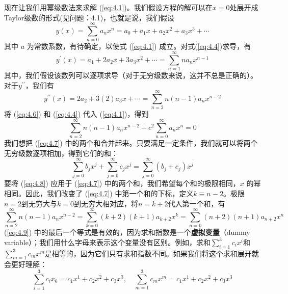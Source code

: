     现在让我们用幂级数法来求解 (\ref{eq:4.1})。我们假设方程的解可以在$x=0$处展开成Taylor级数的形式(见问题：4.1)，也就是说，我们假设
    \begin{equation}
        y\left(x\right) = \sum_{n=0}^{\infty}a_nx^n = a_0 + a_1 x + a_2 x^2 + a_3 x^3 + \cdots
        \label{eq:4.4}
    \end{equation}
    其中 $a$ 为常数系数，有待确定，以使式 (\ref{eq:4.1}) 成立。对式(\ref{eq:4.4})求导，有
    \begin{equation}
        y^{\prime}\left(x\right) = a_1 + 2a_2 x + 3a_3 x^2 + \cdots = \sum_{n=1}^{\infty}na_nx^{n-1}
        \label{eq:4.5}
    \end{equation}
    其中，我们假设该数列可以逐项求导（对于无穷级数来说，这并不总是正确的）。对于$y^{\prime\prime}$，我们有
    \begin{equation}
        y^{\prime\prime}\left(x\right) = 2a_2 + 3\left(2\right)a_3 x + \cdots = \sum_{n=2}^{\infty}n(n-1)a_nx^{n-2}
        \label{eq:4.6}
    \end{equation}
    将 (\ref{eq:4.6}) 和 (\ref{eq:4.4}) 代入 (\ref{eq:4.1})，得到
    \begin{equation}
        \sum_{n=2}^{\infty}n(n-1)a_nx^{n-2} + c^2\sum_{n=0}^{\infty}a_nx^n = 0
        \label{eq:4.7}
    \end{equation}
    我们想把 (\ref{eq:4.7}) 中的两个和合并起来。只要满足一定条件，我们就可以将两个无穷级数逐项相加，得到它们的和：
    \begin{equation}
        \sum_{j=0}^{\infty}b_jx^j + \sum_{j=0}^{\infty}c_jx^j = \sum_{j=0}^{\infty}(b_j+c_j)x^j
        \label{eq:4.8}
    \end{equation}
    要将 (\ref{eq:4.8}) 应用于 (\ref{eq:4.7}) 中的两个和，我们希望每个和的极限相同，$x$ 的幂相同。因此，我们改变了 (\ref{eq:4.7}) 中第一个和的下标，定义$k \equiv n-2$。极限$n = 2$到无穷大与$k = 0$到无穷大相对应，将$n=k+2$代入第一个和，有
    \begin{equation}
        \sum_{n=2}^{\infty}n\left(n-1\right)a_nx^{n-2} = \sum_{k=0}^{\infty}\left(k+2\right)\left(k+1\right)a_{k+2}x^k = \sum_{n=0}^{\infty}\left(n+2\right)\left(n+1\right)a_{n+2}x^n
        \label{eq:4.9}
    \end{equation}
    (\ref{eq:4.9}) 中的最后一个等式是有效的，因为求和指数是一个\textbf{虚拟变量}（dummy variable）；我们用什么字母来表示这个变量没有区别。例如，求和$\sum_{i=1}^{3}c_ix^i$和$\sum_{m=1}^{3}c_mx^m$是相等的，因为它们只有求和指数不同。如果我们将这个求和展开就会更好理解：
    \begin{equation*}
        \sum_{i=1}^{3}c_ix_6 = c_1x^1 + c_2x^2 + c_3x^3, \quad \sum_{m=1}^{3}c_mx^m = c_1x^1 + c_2x^2 + c_3x^3
    \end{equation*}
